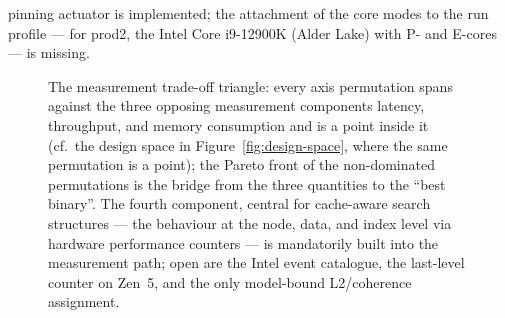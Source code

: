 \begin{nurlang}
pinning actuator is implemented; the attachment of the core modes to the run profile --- for prod2, the Intel
Core i9-12900K (Alder Lake) with P- and E-cores --- is missing.
\begin{figure}[htbp]\centering
{}
\caption{The measurement trade-off triangle: every axis permutation spans against the three opposing
measurement components latency, throughput, and memory consumption and is a point inside it (cf.\ the
design space in Figure~\ref{fig:design-space}, where the same permutation is a point); the Pareto front
of the non-dominated permutations is the bridge from the three quantities to the \enquote{best binary}. The fourth component,
central for cache-aware search structures --- the behaviour at the node, data, and
index level via hardware performance counters --- is mandatorily built into the measurement path; open are the
Intel event catalogue, the last-level counter on Zen~5, and the only model-bound L2/coherence assignment.}\label{fig:measurement-triangle}
\end{figure}

\end{nurlang}
